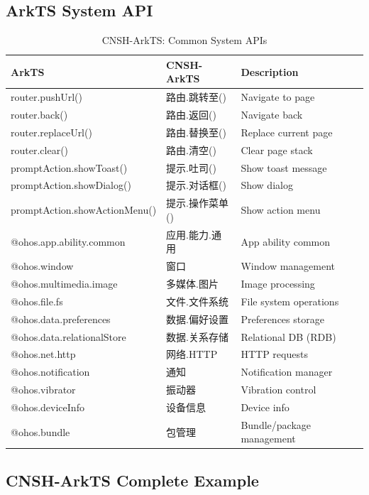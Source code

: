 \subsection{ArkTS System API}

\begin{table}[h]
\centering
\caption{CNSH-ArkTS: Common System APIs}
\renewcommand{\arraystretch}{1.3}
\begin{tabular}{llp{5cm}}
\toprule
\textbf{ArkTS} & \textbf{CNSH-ArkTS} & \textbf{Description} \\
\midrule
router.pushUrl() & 路由.跳转至() & Navigate to page \\
router.back() & 路由.返回() & Navigate back \\
router.replaceUrl() & 路由.替换至() & Replace current page \\
router.clear() & 路由.清空() & Clear page stack \\
promptAction.showToast() & 提示.吐司() & Show toast message \\
promptAction.showDialog() & 提示.对话框() & Show dialog \\
promptAction.showActionMenu() & 提示.操作菜单() & Show action menu \\
\hline
@ohos.app.ability.common & 应用.能力.通用 & App ability common \\
@ohos.window & 窗口 & Window management \\
@ohos.multimedia.image & 多媒体.图片 & Image processing \\
@ohos.file.fs & 文件.文件系统 & File system operations \\
@ohos.data.preferences & 数据.偏好设置 & Preferences storage \\
@ohos.data.relationalStore & 数据.关系存储 & Relational DB (RDB) \\
@ohos.net.http & 网络.HTTP & HTTP requests \\
@ohos.notification & 通知 & Notification manager \\
@ohos.vibrator & 振动器 & Vibration control \\
@ohos.deviceInfo & 设备信息 & Device info \\
@ohos.bundle & 包管理 & Bundle/package management \\
\bottomrule
\end{tabular}
\end{table}

\subsection{CNSH-ArkTS Complete Example}


